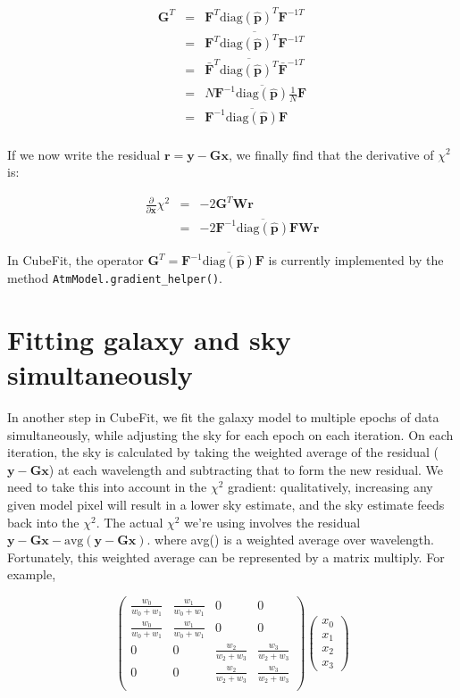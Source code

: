 \documentclass[12pt]{article}
\newcommand{\G}{\mathbf{G}}
\newcommand{\phat}{\mathbf{\hat p}}
\newcommand{\x}{\mathbf{x}}
\newcommand{\y}{\mathbf{y}}
\newcommand{\rvect}{\mathbf{r}}
\newcommand{\W}{\mathbf{W}}
\newcommand{\F}{\mathbf{F}}
\newcommand{\diag}{\mathrm{diag}}
\newcommand{\ddx}{\frac{\partial}{\partial \mathbf{x}}}
\begin{document}
\begin{eqnarray*}
  \G^{T} & = & \F^{T} \diag(\phat)^{T} \F^{-1T}\\
        & = & \overline{\F^{T} \diag(\phat)^{T} \F^{-1T}} \\
        & = & \bar{\F}^T \overline{\diag(\phat)^T} \bar{\F}^{-1T} \\
        & = & N\F^{-1} \overline{\diag(\phat)} \frac{1}{N}\F \\
        & = & \F^{-1} \overline{\diag(\phat)} \F\\
\end{eqnarray*}

\noindent If we now write the residual $\rvect = \y - \G\x$, we
finally find that the derivative of $\chi^{2}$ is:

\begin{eqnarray*}
 \ddx \chi^2 & = & -2 \G^T \W \rvect \\
             & = & -2 \F^{-1} \overline{\diag(\phat)} \F \W \rvect
\end{eqnarray*}

\noindent In CubeFit, the operator $\G^T = \F^{-1}
\overline{\diag(\phat)} \F$ is currently implemented by the method
\verb|AtmModel.gradient_helper()|.

\section{Fitting galaxy and sky simultaneously}

In another step in CubeFit, we fit the galaxy model to multiple epochs
of data simultaneously, while adjusting the sky for each epoch on each
iteration.  On each iteration, the sky is calculated by taking the
weighted average of the residual ($\y - \G \x$) at each wavelength and
subtracting that to form the new residual. We need to take this into
account in the $\chi^2$ gradient: qualitatively, increasing any given
model pixel will result in a lower sky estimate, and the sky estimate
feeds back into the $\chi^2$. The actual $\chi^2$ we're using involves
the residual $\y - \G\x - \mathrm{avg}(\y - \G\x)$. where avg() is a
weighted average over wavelength. Fortunately, this weighted average
can be represented by a matrix multiply. For example,

\begin{equation}
  \left( \begin{array}{cccc}
   \frac{w_0}{w_0 + w_1} & \frac{w_1}{w_0 + w_1} & 0 & 0 \\
   \frac{w_0}{w_0 + w_1} & \frac{w_1}{w_0 + w_1} & 0 & 0 \\
   0   & 0   & \frac{w_2}{w_2 + w_3} & \frac{w_3}{w_2 + w_3} \\
   0   & 0   & \frac{w_2}{w_2 + w_3} & \frac{w_3}{w_2 + w_3} \\
   \end{array} \right)
   \left( \begin{array}{c} x_0 \\ x_1 \\ x_2 \\ x_3 \end{array} \right)
\end{equation}
\end{document}
